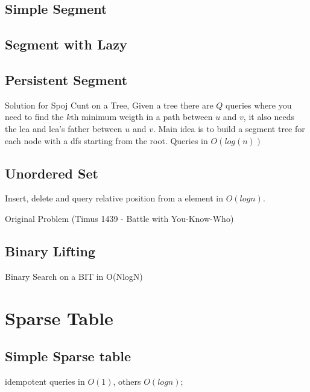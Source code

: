 \documentclass{report}
\begin{document}
    \subsection{Simple Segment}
    
    \newpage
    \subsection{Segment with Lazy}
    
    \newpage
    \subsection{Persistent Segment}
    Solution for Spoj Cunt on a Tree,
    Given a tree there are $Q$ queries where you need to find the $k$th minimum weigth in a path between $u$ and $v$, it also needs the lca and lca's father between $u$ and $v$.\newline
    Main idea is to build a segment tree for each node with a dfs starting from the root.
    \newline 
    Queries in $O(log(n))$
    
    \subsection{Unordered Set}
    Insert, delete and query relative position from a element in $O(logn)$.
    
    \bigskip
    
    Original Problem (Timus 1439 - Battle with You-Know-Who)
    
    
    
    \bigskip
    \subsection{Binary Lifting}
    Binary Search on a BIT in O(NlogN)
    
    
    \section{Sparse Table}
    
    \subsection{Simple Sparse table}
    idempotent queries in $O(1)$, others $O(logn)$;
    
\end{document}
